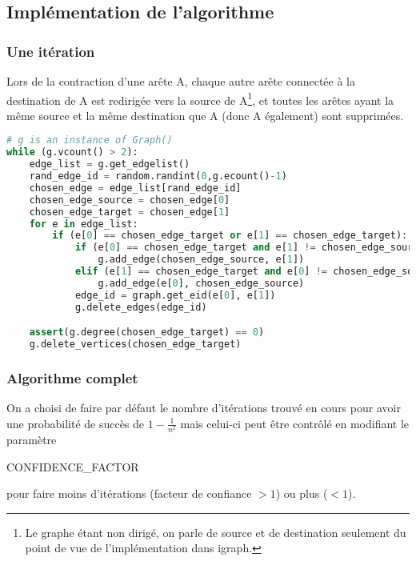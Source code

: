 \documentclass[a4paper,10pt]{article}
\begin{document}
\subsection{Implémentation de l'algorithme}
\subsubsection{Une itération}
Lors de la contraction d'une arête A, chaque autre arête connectée à la destination de A est redirigée vers la source de
A\footnote{Le graphe étant non dirigé, on parle de source et de destination seulement du point de vue de l'implémentation dans igraph.},
et toutes les arêtes ayant la même source et la même destination que A (donc A également) sont supprimées.
\begin{lstlisting}[language=Python]
# g is an instance of Graph()
while (g.vcount() > 2):
	edge_list = g.get_edgelist()
	rand_edge_id = random.randint(0,g.ecount()-1)
	chosen_edge = edge_list[rand_edge_id]
	chosen_edge_source = chosen_edge[0]
	chosen_edge_target = chosen_edge[1]
	for e in edge_list:
		if (e[0] == chosen_edge_target or e[1] == chosen_edge_target):
			if (e[0] == chosen_edge_target and e[1] != chosen_edge_source):
				g.add_edge(chosen_edge_source, e[1])
			elif (e[1] == chosen_edge_target and e[0] != chosen_edge_source):
				g.add_edge(e[0], chosen_edge_source)
			edge_id = graph.get_eid(e[0], e[1])
			g.delete_edges(edge_id)

	assert(g.degree(chosen_edge_target) == 0)
	g.delete_vertices(chosen_edge_target)
\end{lstlisting}
\fontfamily{}

\subsubsection{Algorithme complet}
On a choisi de faire par défaut le nombre d'itérations trouvé en cours pour avoir une probabilité de succès de
\begin{math} 1-\frac{1}{n^{2}} \end{math}
mais celui-ci peut être contrôlé en modifiant le paramètre
\begin{it}CONFIDENCE\_FACTOR\end{it}
pour faire moins d'itérations (facteur de confiance \begin{math}> 1\end{math}) ou plus (\begin{math}< 1\end{math}).
\end{document}

